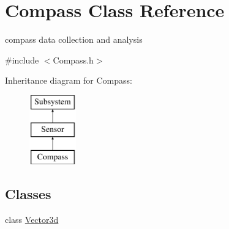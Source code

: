 \hypertarget{classCompass}{\section{Compass Class Reference}
\label{classCompass}
}


compass data collection and analysis  




{\ttfamily \#include $<$Compass.\-h$>$}

Inheritance diagram for Compass\-:\begin{figure}[H]
\begin{center}
\leavevmode
\includegraphics[height=3.000000cm]{classCompass}
\end{center}
\end{figure}
\subsection*{Classes}
\begin{DoxyCompactItemize}
\item 
class \hyperlink{classCompass_1_1Vector3d}{Vector3d}
\end{DoxyCompactItemize}
